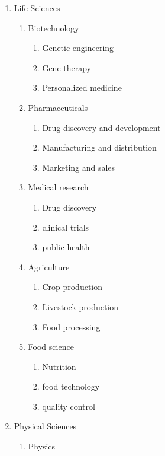 \begin{enumerate}
\begin{enumerate}
\begin{enumerate}
        \end{enumerate}
    \end{enumerate}
    \item Life Sciences
    \begin{enumerate}
        \item Biotechnology
        \begin{enumerate}
            \item Genetic engineering
            \item Gene therapy
            \item Personalized medicine
        \end{enumerate}
        \item Pharmaceuticals 
        \begin{enumerate}
            \item Drug discovery and development
            \item Manufacturing and distribution
            \item Marketing and sales
        \end{enumerate}
        \item Medical research 
        \begin{enumerate}
            \item Drug discovery
            \item clinical trials
            \item public health
        \end{enumerate}
        \item Agriculture 
        \begin{enumerate}
            \item Crop production
            \item Livestock production
            \item Food processing
        \end{enumerate}
        \item Food science 
        \begin{enumerate}
            \item Nutrition
            \item food technology
            \item quality control
        \end{enumerate}
    \end{enumerate}
    \item Physical Sciences
    \begin{enumerate}
        \item Physics

\end{enumerate}
\end{enumerate}

